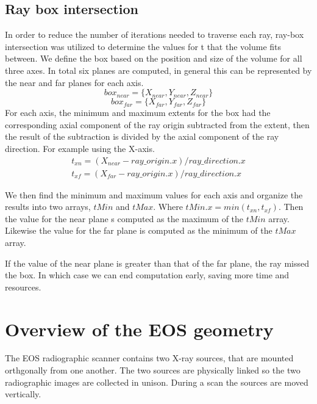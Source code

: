 \documentclass[12pt,twocolumn]{article}
\begin{document}
\subsection{Ray box intersection}
In order to reduce the number of iterations needed to traverse each ray, ray-box intersection was utilized to 
determine the values for t that the volume fits between. We define the box based on the position and size of the volume
for all three axes. In total six planes are computed, in general this can be represented by the near and far planes
for each axis.
\begin{equation}
  box_{near} = \{X_{near}, Y_{near}, Z_{near}\}
\end{equation}
\begin{equation}
  box_{far} = \{X_{far}, Y_{far}, Z_{far}\}
\end{equation}
For each axis, the minimum and maximum extents for the box had the corresponding axial component 
of the ray origin subtracted from the extent, then the result of the subtraction is divided by the axial component 
of the ray direction. For example using the X-axis.
\begin{gather*}
  t_{xn} = (X_{near} - ray\_origin.x) / ray\_direction.x\\
  t_{xf} = (X_{far} - ray\_origin.x) / ray\_direction.x
\end{gather*}

We then find the minimum and maximum values for each axis and organize the results into two arrays, $tMin$ and $tMax$.
Where $tMin.x = min(t_{xn},t_{xf})$. Then the value for the near plane s computed as the maximum of the
$tMin$ array. Likewise the value for the far plane is computed as the minimum of the $tMax$ array.

If the value of the near plane is greater than that of the far plane, the ray missed the box. In which case we can end
computation early, saving more time and resources. 
\cite{glassnerIntro}

\section{Overview of the EOS\textregistered{} geometry}

The EOS\textregistered{} radiographic scanner contains two X-ray sources, that are mounted orthgonally from one
another. The two sources are physically linked so the two radiographic images are collected in unison. During a 
scan the sources are moved vertically.
\end{document}
